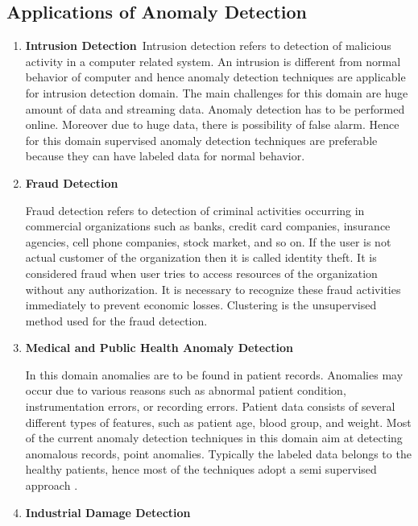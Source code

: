 \subsection{Applications of Anomaly Detection}


\begin{enumerate}
	
\item \textbf{Intrusion Detection}\
Intrusion detection refers to detection of malicious activity in a computer related system. An intrusion is different from normal behavior of computer and hence anomaly detection techniques are applicable for intrusion detection domain. The main challenges for this domain are huge amount of data and streaming data. Anomaly detection has to be performed online. Moreover due to huge data, there is possibility of false alarm. Hence for this domain supervised anomaly detection techniques are preferable because they can have labeled data for normal behavior. 
	 

\item \textbf{Fraud Detection}\

Fraud detection refers to detection of criminal activities occurring in commercial organizations
such as banks, credit card companies, insurance agencies, cell phone companies,
stock market, and so on. If the user is not actual customer of the organization then it is called identity theft. It is considered fraud when user tries to access resources of the organization without any authorization. It is necessary to recognize these fraud activities immediately to prevent economic losses. Clustering \cite{fraud} is the
unsupervised method used for the fraud detection.


\item \textbf{Medical and Public Health Anomaly Detection}\

In this domain anomalies are to be found in patient records. Anomalies may occur due to various reasons such as abnormal
patient condition, instrumentation errors, or recording errors. Patient data consists of several different types of features,
such as patient age, blood group, and weight. Most of the current anomaly detection techniques in this
domain aim at detecting anomalous records, point anomalies. Typically the labeled
data belongs to the healthy patients, hence most of the techniques adopt a semi supervised
approach \cite{medical} . 


\item \textbf{Industrial Damage Detection}\


\end{enumerate}
